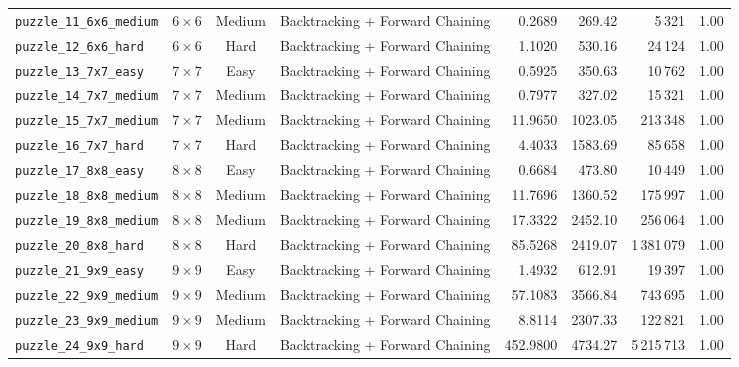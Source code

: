 \documentclass{article}
\begin{document}
\begin{longtable}{@{}lccl r r r c@{}}
  \texttt{puzzle\_11\_6x6\_medium} & $6\times6$ & Medium & Backtracking + Forward Chaining & 0.2689 & 269.42 & 5\,321 & 1.00 \\
  \texttt{puzzle\_12\_6x6\_hard} & $6\times6$ & Hard & Backtracking + Forward Chaining & 1.1020 & 530.16 & 24\,124 & 1.00 \\
  \texttt{puzzle\_13\_7x7\_easy} & $7\times7$ & Easy & Backtracking + Forward Chaining & 0.5925 & 350.63 & 10\,762 & 1.00 \\
  \texttt{puzzle\_14\_7x7\_medium} & $7\times7$ & Medium & Backtracking + Forward Chaining & 0.7977 & 327.02 & 15\,321 & 1.00 \\
  \texttt{puzzle\_15\_7x7\_medium} & $7\times7$ & Medium & Backtracking + Forward Chaining & 11.9650 & 1023.05 & 213\,348 & 1.00 \\
  \texttt{puzzle\_16\_7x7\_hard} & $7\times7$ & Hard & Backtracking + Forward Chaining & 4.4033 & 1583.69 & 85\,658 & 1.00 \\
  \texttt{puzzle\_17\_8x8\_easy} & $8\times8$ & Easy & Backtracking + Forward Chaining & 0.6684 & 473.80 & 10\,449 & 1.00 \\
  \texttt{puzzle\_18\_8x8\_medium} & $8\times8$ & Medium & Backtracking + Forward Chaining & 11.7696 & 1360.52 & 175\,997 & 1.00 \\
  \texttt{puzzle\_19\_8x8\_medium} & $8\times8$ & Medium & Backtracking + Forward Chaining & 17.3322 & 2452.10 & 256\,064 & 1.00 \\
  \texttt{puzzle\_20\_8x8\_hard} & $8\times8$ & Hard & Backtracking + Forward Chaining & 85.5268 & 2419.07 & 1\,381\,079 & 1.00 \\
  \texttt{puzzle\_21\_9x9\_easy} & $9\times9$ & Easy & Backtracking + Forward Chaining & 1.4932 & 612.91 & 19\,397 & 1.00 \\
  \texttt{puzzle\_22\_9x9\_medium} & $9\times9$ & Medium & Backtracking + Forward Chaining & 57.1083 & 3566.84 & 743\,695 & 1.00 \\
  \texttt{puzzle\_23\_9x9\_medium} & $9\times9$ & Medium & Backtracking + Forward Chaining & 8.8114 & 2307.33 & 122\,821 & 1.00 \\
  \texttt{puzzle\_24\_9x9\_hard} & $9\times9$ & Hard & Backtracking + Forward Chaining & 452.9800 & 4734.27 & 5\,215\,713 & 1.00 \\
\end{longtable}
\end{document}
